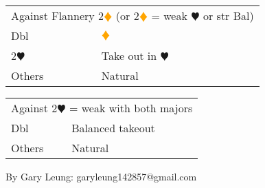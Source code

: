 \documentclass{article}
\newcommand{\he}{\textcolor{RubineRed}{$\varheart$}}
\newcommand{\di}{\textcolor{Orange}{$\vardiamond$}}
\begin{document}
\medskip

\begin{tabular}{|l|p{6.5cm}}
	\multicolumn{2}{l}{Against Flannery 2\di{} (or 2\di{} = weak \he{} or str Bal)} \\
    Dbl & \di{} \\
    2\he{}& Take out in \he{}\\
    Others & Natural
\end{tabular}

\medskip

\begin{tabular}{|l|p{6.5cm}}
	\multicolumn{2}{l}{Against 2\he{} = weak with both majors} \\
    Dbl & Balanced takeout \\
    Others & Natural
\end{tabular}

\vfill
\hfill \footnotesize{By Gary Leung: garyleung142857@gmail.com}
\end{document}
